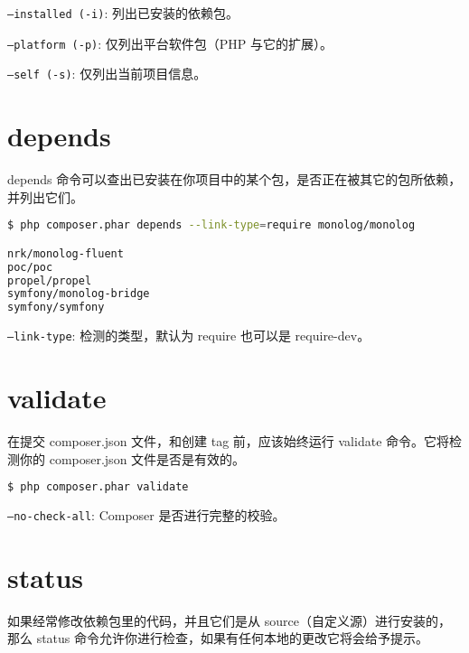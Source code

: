 \begin{compactitem}
\item \texttt{--installed (-i)}: 列出已安装的依赖包。
\item \texttt{--platform (-p)}: 仅列出平台软件包（PHP 与它的扩展）。
\item \texttt{--self (-s)}: 仅列出当前项目信息。
\end{compactitem}

\section{depends}

depends 命令可以查出已安装在你项目中的某个包，是否正在被其它的包所依赖，并列出它们。

\begin{lstlisting}[language=bash]
$ php composer.phar depends --link-type=require monolog/monolog

nrk/monolog-fluent
poc/poc
propel/propel
symfony/monolog-bridge
symfony/symfony
\end{lstlisting}

\begin{compactitem}
\item \texttt{--link-type}: 检测的类型，默认为 require 也可以是 require-dev。
\end{compactitem}



\section{validate}

在提交 composer.json 文件，和创建 tag 前，应该始终运行 validate 命令。它将检测你的 composer.json 文件是否是有效的。

\begin{lstlisting}[language=bash]
$ php composer.phar validate
\end{lstlisting}

\begin{compactitem}
\item \texttt{--no-check-all}: Composer 是否进行完整的校验。
\end{compactitem}

\section{status}

如果经常修改依赖包里的代码，并且它们是从 source（自定义源）进行安装的，那么 status 命令允许你进行检查，如果有任何本地的更改它将会给予提示。

